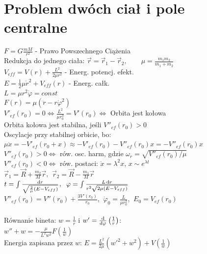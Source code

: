 \documentclass[10pt,a4paper,twocolumn]{article}
\begin{document}
\section{Problem dwóch ciał i pole centralne}
$F = G \frac{mM}{r^2}$ - Prawo Powszechnego Ciążenia \\
Redukcja do jednego ciała:
$\vec r = \vec r_1 - \vec r_2, \qquad \mu = \frac{m_1 m_2}{m_1+m_2}$ \\
$V_{eff} = V(r) + \frac{L^2}{2\mu r^2}$ - Energ. potencj. efekt. \\
$E = \frac1 2 \mu \dot r^2 + V_{eff}(r)$ - Energ. całk.\\
$L = \mu r^2 \dot \varphi = const$ \\
$F(r) = \mu \left(\ddot r - r \dot \varphi^2\right)$\\
$V'_{ef}(r_0) = 0 \iff \frac{L^2}{\mu r_0^3} = V'(r_0) \iff$ Orbita jest kołowa \\
Orbita kołowa jest stabilna, jeśli $V''_{ef}(r_0) > 0$ \\
Oscylacje przy stabilnej orbicie, bo: \\
$\mu \ddot x = -V'_{ef}(r_0 + x) \approx -V'_{ef}(r_0) - V''_{ef}(r_0)x = -V''_{ef}(r_0)x$\\
$V''_{ef}(r_0) > 0 \iff$ rów. osc. harm, gdzie $\omega_r = \sqrt{V''_{ef}(r_0)/\mu}$ \\ 
$V''_{ef}(r_0) < 0 \iff$ rów. postaci: $\ddot x = \lambda^2 x$, $x \sim e^{\lambda t}$ \\
$\vec r_1 = \vec R + \frac{m_2}{M}\vec r$, $\ \vec r_2 = \vec R - \frac{m_1}{M}\vec r$ \\
$t = \int\frac{\text dr}{\sqrt{\frac2\mu(E-V_{eff})}}$, $\ \varphi = \int\frac{L\,\text dr}{r^2\sqrt{2\mu(E-V_{eff})}}$ \\
$V''_{ef}(r_0) = V''(r_0) + \frac{3V'(r_0)}{r_0}$, $\ \dot\varphi_0 = \frac{L}{\mu r_0^2}$, $\ E_0 = V_{ef}(r_0)$ \\
\\
Równanie bineta: $w = \frac{1}{r}$ i $w' = \frac{\text d}{\text d \varphi}\left(\frac 1 r\right)$:\\
$w'' + w = - \frac{\mu}{L^2 w^2}F(\frac{1}{w})$ \\
Energia zapisana przez $w$:
$E = \frac{L^2}{2\mu}\left({w'}^2 + w^2\right) + V(\frac1 w)$
\end{document}
